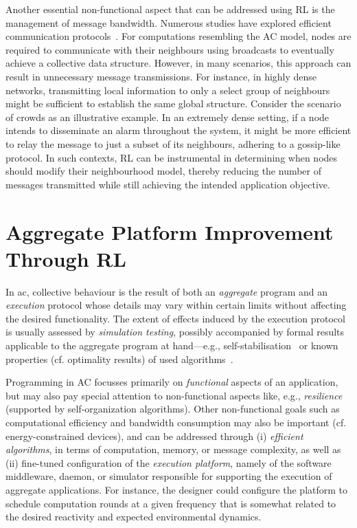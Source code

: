 {Another essential non-functional aspect that can be addressed using \ac{RL} is the management of message bandwidth. 
 Numerous studies have explored efficient communication protocols~\cite{DBLP:conf/nips/ZhangZL19, su2019cooperative}. 
 For computations resembling the AC model, nodes are required to communicate with their neighbours using broadcasts to eventually achieve a collective data structure. 
 However, in many scenarios, this approach can result in unnecessary message transmissions. 
 For instance, in highly dense networks, transmitting local information to only a select group of neighbours might be sufficient to establish the same global structure.
%
Consider the scenario of crowds as an illustrative example. 
 In an extremely dense setting, if a node intends to disseminate an alarm throughout the system, 
 it might be more efficient to relay the message to just a subset of its neighbours, 
 adhering to a gossip-like protocol.
In such contexts, \ac{RL} can be instrumental in determining 
 when nodes should modify their neighbourhood model, 
 thereby reducing the number of messages transmitted 
 while still achieving the intended application objective.
}
\section{Aggregate Platform Improvement Through \Acl{RL}}\label{acsos2022:sec:contribution}
In \ac{ac}, collective behaviour 
 is the result of both
 an \emph{aggregate} program
 and an \emph{execution} protocol
 whose details may vary within certain limits
 without affecting the desired functionality.
%
The extent of effects induced by the execution protocol
 is usually assessed by \emph{simulation testing},
 possibly accompanied by formal results applicable to the aggregate program at hand---e.g., self-stabilisation~\cite{DBLP:journals/tomacs/ViroliABDP18}
  or known properties (cf. optimality results) of used algorithms~\cite{DBLP:conf/saso/AudritoCDV17,DBLP:journals/cee/AudritoCDPV21}.

Programming in \ac{AC}
 focusses primarily on \emph{functional} aspects of an application,
 but may also pay special attention to non-functional aspects like, e.g., \emph{resilience} (supported by self-organization algorithms).
%
Other non-functional goals such as computational efficiency and bandwidth consumption may also be important (cf. energy-constrained devices), 
 and can be addressed through (i) \emph{efficient algorithms}, in terms of computation, memory, or message complexity,
 as well as 
 (ii) fine-tuned configuration of the \emph{execution platform}, namely of the software middleware, daemon, or simulator responsible for supporting the execution of aggregate applications. 
%
For instance, the designer could configure the platform 
 to schedule computation rounds 
 at a given frequency
 that is somewhat related to the desired reactivity
 and expected environmental dynamics.

